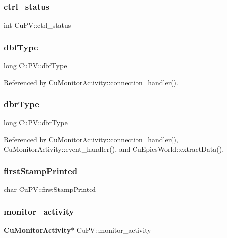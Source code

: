 \mbox{\label{structCuPV_a16089d9a89698ae1c5df1c3466d23697}} 
\subsubsection{ctrl\+\_\+status}
{\footnotesize\ttfamily int Cu\+P\+V\+::ctrl\+\_\+status}

\mbox{\label{structCuPV_a38a61276adfeb7c8a75fbaa158d01e41}} 
\subsubsection{dbf\+Type}
{\footnotesize\ttfamily long Cu\+P\+V\+::dbf\+Type}



Referenced by Cu\+Monitor\+Activity\+::connection\+\_\+handler().

\mbox{\label{structCuPV_ade6e854708ebd90cf92291dd0373d91e}} 
\subsubsection{dbr\+Type}
{\footnotesize\ttfamily long Cu\+P\+V\+::dbr\+Type}



Referenced by Cu\+Monitor\+Activity\+::connection\+\_\+handler(), Cu\+Monitor\+Activity\+::event\+\_\+handler(), and Cu\+Epics\+World\+::extract\+Data().

\mbox{\label{structCuPV_a02e74701fb0ada1ca89c13d3da8a1ba8}} 
\subsubsection{first\+Stamp\+Printed}
{\footnotesize\ttfamily char Cu\+P\+V\+::first\+Stamp\+Printed}

\mbox{\label{structCuPV_a6bcc932414c433de20a121791b6e91ca}} 
\subsubsection{monitor\+\_\+activity}
{\footnotesize\ttfamily \textbf{ Cu\+Monitor\+Activity}$\ast$ Cu\+P\+V\+::monitor\+\_\+activity}



